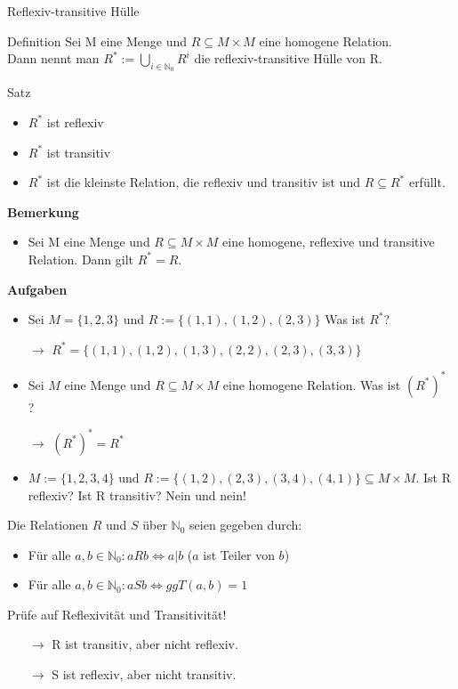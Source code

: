 \documentclass[]{beamer}
\begin{document}
\begin{frame}{Reflexiv-transitive Hülle}
	\bp\begin{block}{Definition}
		Sei M eine Menge und $R \subseteq M \times M$ eine homogene Relation. \\Dann nennt man $R^* := \bigcup\limits_{i \in \mathbb{N}_0} R^i$ die reflexiv-transitive Hülle von R.
	\end{block}
	\bp\begin{block}{Satz}
		\begin{itemize}
			\item $R^*$ ist reflexiv
			\item $R^*$ ist transitiv
			\item $R^*$ ist die kleinste Relation, die reflexiv und transitiv ist und $R \subseteq R^*$ erfüllt.
		\end{itemize}
	\end{block}
	\bp\textbf{Bemerkung}\\
	\begin{itemize}
		\item Sei M eine Menge und $R\subseteq M \times M$ eine homogene, reflexive und transitive Relation. Dann gilt $R^* = R$.
	\end{itemize}
	
\end{frame}
\begin{frame}
	\textbf{Aufgaben}\\
	\begin{itemize}
		\item Sei $M = \{1, 2, 3\}$ und $R := \{(1,1), (1,2), (2,3)\}$ Was ist $R^*$?
		\pause
		\item[$\rightarrow$] $R^* = \{(1,1), (1,2), (1,3), (2,2), (2,3), (3,3)\}$ 
		\pause
		\item Sei $M$ eine Menge und $R \subseteq M \times M$ eine homogene Relation. Was ist $(R^*)^*$ ?
		\pause
		\item[$\rightarrow$]  $(R^*)^* = R^*$
		\pause
		\item $M := \{1,2,3,4\} \text{ und } R := \{(1,2), (2,3), (3,4), (4,1)\} \subseteq M \times M$. Ist R reflexiv? Ist R transitiv? \pause \hspace{0.3cm} Nein und nein!
	\end{itemize}
\end{frame}

\begin{frame}
	Die Relationen $R$ und $S$ über $\mathbb{N}_0$ seien gegeben durch:
	\begin{itemize}
		\item Für alle $a, b \in \mathbb{N}_0: aRb \Leftrightarrow a|b$ ($a$ ist Teiler von $b$)
		\item Für alle $a, b \in \mathbb{N}_0: aSb \Leftrightarrow ggT(a,b) = 1$ 
	\end{itemize}
	Prüfe auf Reflexivität und Transitivität!
	\pause
	\begin{itemize}
		\item[$\rightarrow$] R ist transitiv, aber nicht reflexiv.
		\pause
		\item[$\rightarrow$] S ist reflexiv, aber nicht transitiv.
	\end{itemize}
\end{frame}


\end{document}
